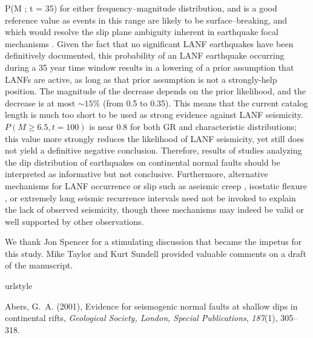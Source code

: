 \documentclass[draft,grl]{AGUTeX}
\begin{document}
\begin{article}
P(M ; t = 35)  for either frequency–magnitude distribution,
and is a good reference value as events in this range are likely to be
surface–breaking, and which would resolve the slip plane ambiguity inherent in
earthquake focal mechanisms \citep{hecker2013eqdist}. Given the fact that no
significant LANF earthquakes have been definitively documented, this
probability of an LANF earthquake occurring during a 35 year time window
results in a lowering of a prior assumption that LANFs are active, as long as
that prior assumption is not a strongly-help position. The magnitude of the
decrease depends on the prior likelihood, and the decrease is at most $\sim 15
\%$ (from 0.5 to 0.35). This means that the current catalog length is much too
short to be used as strong evidence against LANF seismicity.  $P(M\ge6.5,
t=100)$ is near 0.8 for both GR and characteristic distributions; this value
more strongly reduces the likelihood of LANF seismicity, yet still does not
yield a definitive negative conclusion.  Therefore, results of studies
analyzing the dip distribution of earthquakes on continental normal faults
\citep{jackson1987, collettinisibson2001} should be interpreted as informative
but not conclusive. Furthermore, alternative mechanisms for LANF occurrence or
slip such as aseismic creep \citep [e.g.,][]{collettini2011lanfmech,
hreinsdottir2009altotib}, isostatic flexure \citep[e.g.,][]
{wernickeaxen1988rolling}, or extremely long seismic recurrence intervals
\citep{wernicke1995seis} need not be invoked to explain the lack of observed
seismicity, though these mechanisms may indeed be valid or well supported by
other observations.



\begin{acknowledgements}
  We thank Jon Spencer for a stimulating discussion that became the impetus for
  this study.  Mike Taylor and Kurt Sundell provided valuable comments on
  a draft of the manuscript. 
 
\end{acknowledgements}

\begin{thebibliography}{32}
\providecommand{\natexlab}[1]{#1}
\expandafter\ifx\csname urlstyle\endcsname\relax
  \providecommand{\doi}[1]{doi:\discretionary{}{}{}#1}\else
  \providecommand{\doi}{doi:\discretionary{}{}{}\begingroup
  \urlstyle{rm}\Url}\fi

Abers, G.~A. (2001), Evidence for seismogenic normal faults at shallow dips in
  continental rifts, \textit{Geological Society, London, Special Publications},
  \textit{187}(1), 305--318.


\end{thebibliography}
\end{article}
\end{document}
